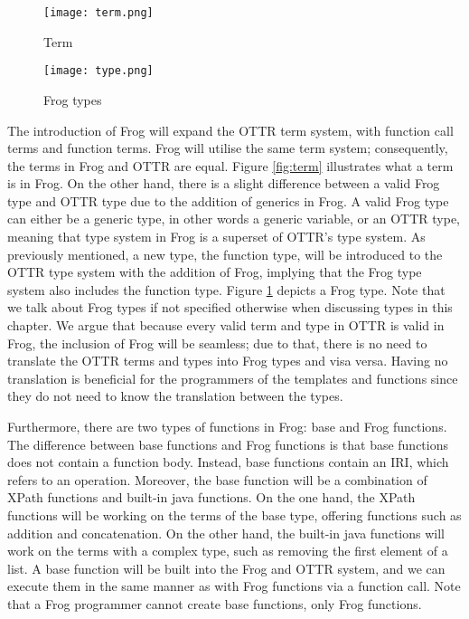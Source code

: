 \begin{figure}
    \centering
    \begin{minipage}{.5\textwidth}
      \centering
      \texttt{[image: term.png]}
      \caption{Term}
      \label{fig:term}
    \end{minipage}%
    \begin{minipage}{.5\textwidth}
      \centering
      \texttt{[image: type.png]}
      \caption{Frog types}
      \label{fig:type}
    \end{minipage}
\end{figure}

\para
The introduction of Frog will expand the OTTR term system, with function call terms and function terms. Frog will utilise the same term system; consequently, the terms in Frog and OTTR are equal. Figure \ref{fig:term} illustrates what a term is in Frog. On the other hand, there is a slight difference between a valid Frog type and OTTR type due to the addition of generics in Frog. A valid Frog type can either be a generic type, in other words a generic variable, or an OTTR type, meaning that type system in Frog is a superset of OTTR's type system. As previously mentioned, a new type, the function type, will be introduced to the OTTR type system with the addition of Frog, implying that the Frog type system also includes the function type. Figure \ref{fig:type} depicts a Frog type. Note that we talk about Frog types if not specified otherwise when discussing types in this chapter. We argue that because every valid term and type in OTTR is valid in Frog, the inclusion of Frog will be seamless; due to that, there is no need to translate the OTTR terms and types into Frog types and visa versa. Having no translation is beneficial for the programmers of the templates and functions since they do not need to know the translation between the types.  

\para
Furthermore, there are two types of functions in Frog: base and Frog functions. The difference between base functions and Frog functions is that base functions does not contain a function body. Instead, base functions contain an IRI, which refers to an operation. Moreover, the base function will be a combination of XPath functions and built-in java functions. On the one hand, the XPath functions will be working on the terms of the base type, offering functions such as addition and concatenation. On the other hand, the built-in java functions will work on the terms with a complex type, such as removing the first element of a list. A base function will be built into the Frog and OTTR system, and we can execute them in the same manner as with Frog functions via a function call. Note that a Frog programmer cannot create base functions, only Frog functions.


